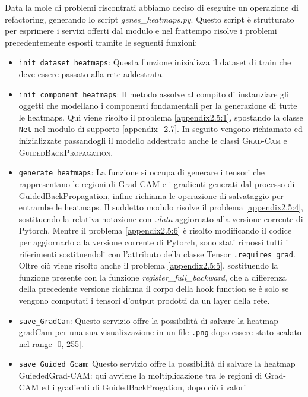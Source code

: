 Data la mole di problemi riscontrati abbiamo deciso di eseguire un operazione di refactoring, generando lo script
\textit{genes\_heatmaps.py}. Questo script è strutturato per esprimere i servizi offerti dal modulo e nel frattempo
risolve i problemi precedentemente esposti tramite le seguenti funzioni:
\begin{itemize}
    \item \texttt{init\_dataset\_heatmaps}: Questa funzione inizializza il dataset di train che deve essere passato 
    alla rete addestrata.
    \item \texttt{init\_component\_heatmaps}: Il metodo assolve al compito di instanziare gli oggetti che modellano i
    componenti fondamentali per la generazione di tutte le heatmaps. Qui viene risolto il problema \ref{appendix2.5:1},
    spostando la classe \texttt{Net} nel modulo di supporto \ref{appendix_2.7}. In seguito vengono richiamato ed
    inizializzate passandogli il modello addestrato anche le classi \textsc{Grad-Cam} e \textsc{GuidedBackPropagation}.
    \item \texttt{generate\_heatmaps}: La funzione si occupa di generare i tensori che rappresentano le regioni di 
    Grad-CAM e i gradienti generati dal processo di GuidedBackPropagation, infine richiama le operazione di salvataggio
    per entrambe le heatmaps. Il suddetto modulo risolve il problema \ref{appendix2.5:4}, sostituendo la relativa
    notazione con \textit{.data} aggiornato alla versione corrente di Pytorch. Mentre il problema \ref{appendix2.5:6} è
    risolto modificando il codice per aggiornarlo alla versione corrente di Pytorch, sono stati rimossi tutti i
    riferimenti sostituendoli con l'attributo della classe Tensor \texttt{.requires\_grad}. Oltre ciò viene risolto
    anche il problema \ref{appendix2.5:5}, sostituendo la funzione presente con la funzione 
    \textit{register\_full\_backward}, che a differenza della precedente versione richiama il corpo della 
    hook function se è solo se vengono computati i tensori d'output prodotti da un layer della rete.
    \item \texttt{save\_GradCam}: Questo servizio offre la possibilità di salvare la heatmap gradCam per una sua
    visualizzazione in un file \texttt{.png} dopo essere stato scalato nel range [0, 255].
    \item \texttt{save\_Guided\_Gcam}: Questo servizio offre la possibilità di salvare la heatmap GuiededGrad-CAM: 
    qui avviene la moltiplicazione tra le regioni di Grad-CAM ed i gradienti di GuidedBackProgation, dopo ciò i valori

\end{itemize}
